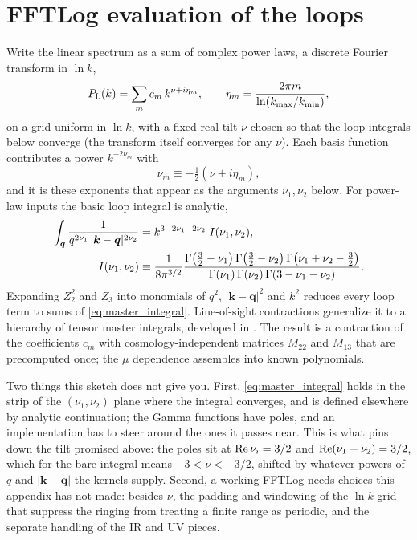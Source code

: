 \documentclass[a4paper,11pt]{article}
\newcommand{\vq}{\bm{q}}
\newcommand{\vk}{\bm{k}}
\def\Plin{P_{\rm L}}
\numberwithin{equation}{section}
\begin{document}
\section{FFTLog evaluation of the loops}
\label{app:fftlog}

Write the linear spectrum as a sum of complex power laws, a discrete Fourier
transform in $\ln k$,
\begin{equation}
\Plin(k) = \sum_{m} c_m\,k^{\nu + i\eta_m} ,
\qquad
\eta_m = \frac{2\pi m}{\ln(k_{\rm max}/k_{\rm min})} ,
\label{eq:fftlog_expansion}
\end{equation}
on a grid uniform in $\ln k$, with a fixed real tilt $\nu$ chosen so that the
loop integrals below converge (the transform itself converges for any $\nu$).
Each basis function contributes a power $k^{-2\nu_m}$ with
\begin{equation}
\nu_m \equiv -\tfrac12\left(\nu + i\eta_m\right) ,
\label{eq:nu_m}
\end{equation}
and it is these exponents that appear as the arguments $\nu_1,\nu_2$ below. For
power-law inputs the basic loop integral is analytic,
\begin{align}
\int_{\vq}\frac{1}{q^{2\nu_1}\,|\vk-\vq|^{2\nu_2}}
&= k^{3-2\nu_1-2\nu_2}\;I(\nu_1,\nu_2),
\label{eq:master_integral}\\
I(\nu_1,\nu_2) &\equiv
\frac{1}{8\pi^{3/2}}
\frac{\Gamma\!\left(\tfrac32-\nu_1\right)\Gamma\!\left(\tfrac32-\nu_2\right)
\Gamma\!\left(\nu_1+\nu_2-\tfrac32\right)}
{\Gamma(\nu_1)\,\Gamma(\nu_2)\,\Gamma(3-\nu_1-\nu_2)} .
\notag
\end{align}
Expanding $Z_2^2$ and $Z_3$ into monomials of $q^2$, $|\vk-\vq|^2$ and $k^2$
reduces every loop term to sums of \eqref{eq:master_integral}. Line-of-sight
contractions generalize it to a hierarchy of tensor master integrals, developed
in \cite{Nguyen2025}. The result is a contraction of the coefficients $c_m$
with cosmology-independent matrices $M_{22}$ and $M_{13}$ that are precomputed
once; the $\mu$ dependence assembles into known polynomials.

Two things this sketch does not give you. First, \eqref{eq:master_integral} holds
in the strip of the $(\nu_1,\nu_2)$ plane where the integral converges, and is
defined elsewhere by analytic continuation; the Gamma functions have poles, and
an implementation has to steer around the ones it passes near. This is what
pins down the tilt promised above: the poles sit at ${\rm Re}\,\nu_i = 3/2$ and
${\rm Re}(\nu_1+\nu_2) = 3/2$, which for the bare integral means
$-3 < \nu < -3/2$, shifted by whatever powers of $q$ and $|\vk-\vq|$ the kernels
supply. Second, a working FFTLog needs choices this appendix has not made:
besides $\nu$, the padding and windowing of the $\ln k$ grid that suppress the
ringing from treating a finite range as periodic, and the separate handling of
the IR and UV pieces.
\end{document}
